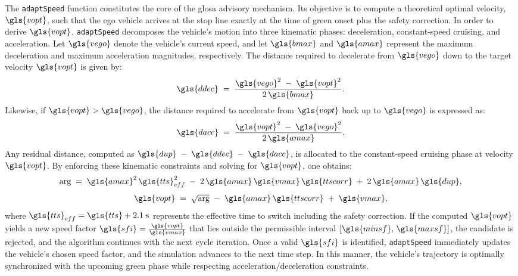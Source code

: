 The \texttt{adaptSpeed} function constitutes the core of the \ac{glosa} advisory mechanism. Its objective is to compute a theoretical optimal velocity, $\gls{vopt}$, such that the ego vehicle arrives at the stop line exactly at the time of green onset plus the safety correction. In order to derive $\gls{vopt}$, \texttt{adaptSpeed} decomposes the vehicle’s motion into three kinematic phases: deceleration, constant‐speed cruising, and acceleration. Let $\gls{vego}$ denote the vehicle’s current speed, and let $\gls{bmax}$ and $\gls{amax}$ represent the maximum deceleration and maximum acceleration magnitudes, respectively. The distance required to decelerate from $\gls{vego}$ down to the target velocity $\gls{vopt}$ is given by:
\begin{equation}
    \gls{ddec} \;=\; \frac{\gls{vego}^2 \;-\; \gls{vopt}^2}{2\,\gls{bmax}}.
\end{equation}
Likewise, if $\gls{vopt} > \gls{vego}$, the distance required to accelerate from $\gls{vopt}$ back up to $\gls{vego}$ is expressed as:
\begin{equation}
    \gls{dacc} \;=\; \frac{\gls{vopt}^2 \;-\; \gls{vego}^2}{2\,\gls{amax}}.
\end{equation}
Any residual distance, computed as $\gls{dup} \;-\; \gls{ddec} \;-\; \gls{dacc}$, is allocated to the constant‐speed cruising phase at velocity $\gls{vopt}$. By enforcing these kinematic constraints and solving for $\gls{vopt}$, one obtains:
\begin{equation}
    \mathrm{arg} \;=\; \gls{amax}^2\,\gls{tts}_{eff}^2 \;-\; 2\,\gls{amax}\,\gls{vmax}\,\gls{ttscorr} \;+\; 2\,\gls{amax}\,\gls{dup},
\end{equation}
\begin{equation}
\gls{vopt} \;=\; \sqrt{\mathrm{arg}} \;-\; \gls{amax}\,\gls{ttscorr} \;+\; \gls{vmax},
\end{equation}
where $\gls{tts}_{eff} = \gls{tts} + 2.1 \;\text{s}$ represents the effective time to switch including the safety correction. If the computed $\gls{vopt}$ yields a new speed factor $\gls{sfi} = \frac{\gls{vopt}}{\gls{vmax}}$ that lies outside the permissible interval $[\gls{minsf},\,\gls{maxsf}]$, the candidate is rejected, and the algorithm continues with the next cycle iteration. Once a valid $\gls{sfi}$ is identified, \texttt{adaptSpeed} immediately updates the vehicle’s chosen speed factor, and the simulation advances to the next time step. In this manner, the vehicle’s trajectory is optimally synchronized with the upcoming green phase while respecting acceleration/deceleration constraints.

